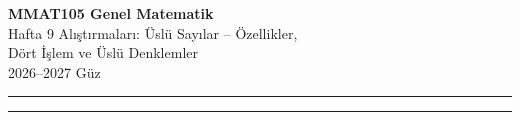 \documentclass[11pt,a4paper]{article}
\newcounter{alis}
\begin{document}
\begin{minipage}[c]{\textwidth}
{\LARGE\bfseries\color{anamavi} MMAT105 Genel Matematik}\\[4pt]
{\large Hafta 9 Alıştırmaları: Üslü Sayılar -- Özellikler,\\ Dört İşlem ve Üslü Denklemler}\\[6pt]
{\small 2026--2027 Güz}
\end{minipage}

\vspace{4pt}\noindent\textcolor{anamavi}{\rule{\textwidth}{1pt}}



\vspace{6pt}
\noindent\textcolor{anamavi}{\rule{\textwidth}{0.5pt}}\\
{\small }
\end{document}
